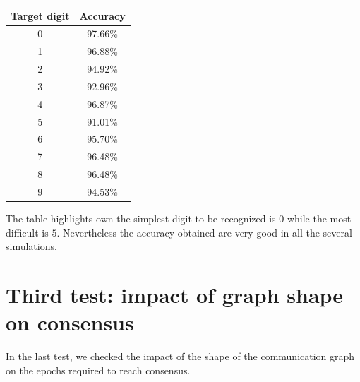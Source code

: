 \documentclass[a4paper,11pt,oneside]{book}
\begin{document}
\begin{center}
\begin{tabular}{|c|c|}
\hline
Target digit & Accuracy \\
\hline
0 & 97.66\% \\
1 & 96.88\% \\
2 & 94.92\% \\
3 & 92.96\% \\
4 & 96.87\% \\
5 & 91.01\% \\
6 & 95.70\% \\
7 & 96.48\%\\
8 & 96.48\% \\
9 & 94.53\% \\
\hline
\end{tabular}
\end{center}

The table highlights own the simplest digit to be recognized is $0$ while the most difficult is $5$. Nevertheless the accuracy obtained are very good in all the several simulations.

\section{Third test: impact of graph shape on consensus}
In the last test, we checked the impact of the shape of the communication graph on the epochs required to reach consensus.
\end{document}
